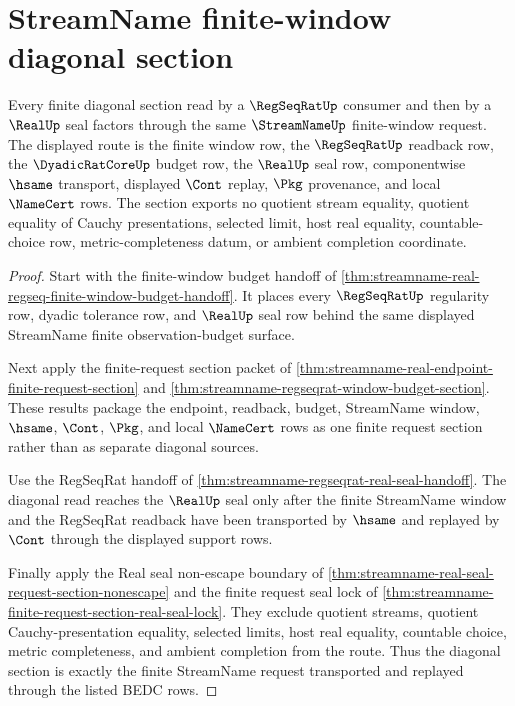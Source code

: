 \section{StreamName finite-window diagonal section}
\label{sec:streamname-finite-window-diagonal-section}

\begin{theorem}
\label{thm:streamname-finite-window-diagonal-section}
Every finite diagonal section read by a $\RegSeqRatUp$ consumer and then by a $\RealUp$ seal factors through the same $\StreamNameUp$ finite-window request. The displayed route is the finite window row, the $\RegSeqRatUp$ readback row, the $\DyadicRatCoreUp$ budget row, the $\RealUp$ seal row, componentwise $\hsame$ transport, displayed $\Cont$ replay, $\Pkg$ provenance, and local $\NameCert$ rows. The section exports no quotient stream equality, quotient equality of Cauchy presentations, selected limit, host real equality, countable-choice row, metric-completeness datum, or ambient completion coordinate.
\end{theorem}
\begin{proof}
Start with the finite-window budget handoff of \autoref{thm:streamname-real-regseq-finite-window-budget-handoff}. It places every $\RegSeqRatUp$ regularity row, dyadic tolerance row, and $\RealUp$ seal row behind the same displayed StreamName finite observation-budget surface.

Next apply the finite-request section packet of \autoref{thm:streamname-real-endpoint-finite-request-section} and \autoref{thm:streamname-regseqrat-window-budget-section}. These results package the endpoint, readback, budget, StreamName window, $\hsame$, $\Cont$, $\Pkg$, and local $\NameCert$ rows as one finite request section rather than as separate diagonal sources.

Use the RegSeqRat handoff of \autoref{thm:streamname-regseqrat-real-seal-handoff}. The diagonal read reaches the $\RealUp$ seal only after the finite StreamName window and the RegSeqRat readback have been transported by $\hsame$ and replayed by $\Cont$ through the displayed support rows.

Finally apply the Real seal non-escape boundary of \autoref{thm:streamname-real-seal-request-section-nonescape} and the finite request seal lock of \autoref{thm:streamname-finite-request-section-real-seal-lock}. They exclude quotient streams, quotient Cauchy-presentation equality, selected limits, host real equality, countable choice, metric completeness, and ambient completion from the route. Thus the diagonal section is exactly the finite StreamName request transported and replayed through the listed BEDC rows.
\end{proof}

